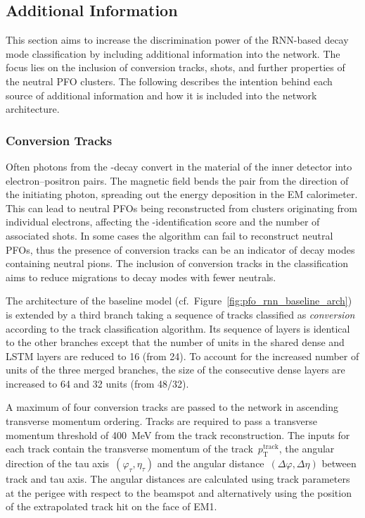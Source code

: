 \subsection{Additional Information}
\label{sec:add_info}

This section aims to increase the discrimination power of the RNN-based decay
mode classification by including additional information into the network. The
focus lies on the inclusion of conversion tracks, shots, and further properties
of the neutral PFO clusters. The following describes the intention behind each
source of additional information and how it is included into the network
architecture.

\subsubsection{Conversion Tracks}
Often photons from the -decay convert in the material of the
inner detector into electron--positron pairs. The magnetic field bends the pair
from the direction of the initiating photon, spreading out the energy deposition
in the EM calorimeter. This can lead to neutral PFOs being reconstructed from
clusters originating from individual electrons, affecting the
-identification score and the number of associated shots. In some
cases the algorithm can fail to reconstruct neutral PFOs, thus the presence of
conversion tracks can be an indicator of decay modes containing neutral pions.
The inclusion of conversion tracks in the classification aims to reduce
migrations to decay modes with fewer neutrals.

The architecture of the baseline model (cf.\
Figure~\ref{fig:pfo_rnn_baseline_arch}) is extended by a third branch taking a
sequence of tracks classified as \emph{conversion} according to the track
classification algorithm. Its sequence of layers is identical to the other
branches except that the number of units in the shared dense and LSTM layers are
reduced to 16 (from 24). To account for the increased number of units of the
three merged branches, the size of the consecutive dense layers are increased to
64 and 32 units (from 48/32).

A maximum of four conversion tracks are passed to the network in ascending
transverse momentum ordering. Tracks are required to pass a transverse momentum
threshold of \SI{400}{\MeV} from the track reconstruction. The inputs for each
track contain the transverse momentum of the track~$p_\text{T}^\text{track}$,
the angular direction of the tau axis~$(\varphi_\tau, \eta_\tau)$ and the
angular distance~$(\Delta\varphi, \Delta\eta)$ between track and tau axis. The
angular distances are calculated using track parameters at the perigee with
respect to the beamspot and alternatively using the position of the extrapolated
track hit on the face of EM1.

